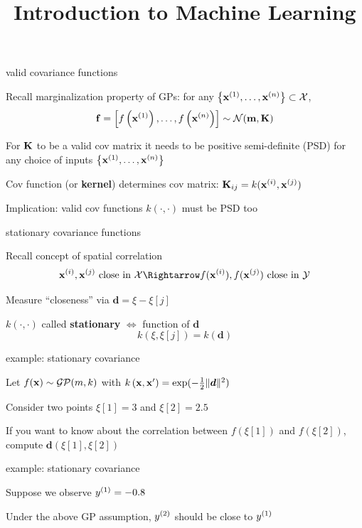 \documentclass[11pt,compress,t,notes=noshow, xcolor=table]{beamer}
\title{Introduction to Machine Learning}
\begin{document}

\begin{framei}[sep=L]{valid covariance functions}
\item Recall marginalization property of GPs: for any $\xdat \subset \Xspace$,
$$\fv = \fvec \sim \gaussmk$$
\item For $\Kmat$ to be a valid cov matrix it needs to be positive semi-definite (PSD) for any choice of inputs $\xdat$
\item Cov function (or \textbf{kernel}) determines cov matrix: $\Kmat_{ij} = k(\xi, \xi[j])$
\item Implication: valid cov functions $k(\cdot, \cdot)$ must be PSD too
\end{framei}

\begin{framei}[sep=L]{stationary covariance functions}
\item Recall concept of spatial correlation
$$\xi, \xi[j] \text{ close in } \Xspace \Rightarrow f(\xi), f(\xi[j]) \text{ close in } \Yspace$$
\item Measure ``closeness'' via $\bm{d} = \xi - \xi[j]$
\item $k(\cdot, \cdot)$ called \textbf{stationary} $\Leftrightarrow$ function of $\bm{d}$ 
$$k(\xi, \xi[j]) = k(\bm{d})$$
\end{framei}

\begin{framei}{example: stationary covariance}
\item Let $\fx \sim \mathcal{GP}(m, k)$ with $\kxxp = \exp(-\tfrac{1}{2}\|\bm{d}\|^2)$
\item Consider two points $\xi[1] = 3$ and $\xi[2] = 2.5$
\item If you want to know about the correlation between $f(\xi[1])$ and $f(\xi[2])$, compute $\bm{d}(\xi[1], \xi[2])$
\vfill
{}
\end{framei}

\begin{framei}{example: stationary covariance}
\item Suppose we observe $\yi[1] = -0.8$
\item Under the above GP assumption, $\yi[2]$ should be close to $\yi[1]$ 
\vfill
{}
\end{framei}
\end{document}
